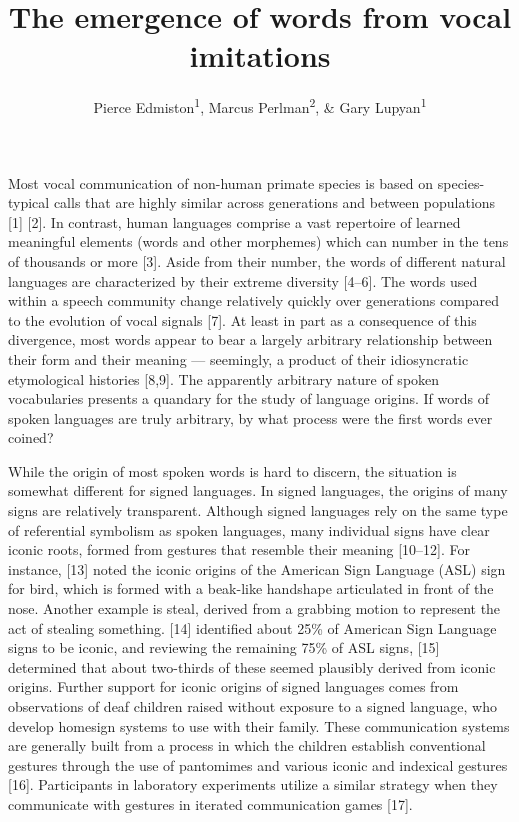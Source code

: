\documentclass[english,floatsintext,man]{apa6}
\title{The emergence of words from vocal imitations}
\author{Pierce Edmiston\textsuperscript{1}, Marcus Perlman\textsuperscript{2}, \& Gary Lupyan\textsuperscript{1}}
\affiliation{
    \vspace{0.5cm}
          \textsuperscript{1} University of Wisconsin-Madison\\
          \textsuperscript{2} University of Birmingham  }
\theoremstyle{definition}
\theoremstyle{definition}
\theoremstyle{definition}
\theoremstyle{remark}
\begin{document}
\maketitle

\setcounter{secnumdepth}{0}



Most vocal communication of non-human primate species is based on
species-typical calls that are highly similar across generations and
between populations {[}1{]} {[}2{]}. In contrast, human languages
comprise a vast repertoire of learned meaningful elements (words and
other morphemes) which can number in the tens of thousands or more
{[}3{]}. Aside from their number, the words of different natural
languages are characterized by their extreme diversity {[}4--6{]}. The
words used within a speech community change relatively quickly over
generations compared to the evolution of vocal signals {[}7{]}. At least
in part as a consequence of this divergence, most words appear to bear a
largely arbitrary relationship between their form and their meaning ---
seemingly, a product of their idiosyncratic etymological histories
{[}8,9{]}. The apparently arbitrary nature of spoken vocabularies
presents a quandary for the study of language origins. If words of
spoken languages are truly arbitrary, by what process were the first
words ever coined?

While the origin of most spoken words is hard to discern, the situation
is somewhat different for signed languages. In signed languages, the
origins of many signs are relatively transparent. Although signed
languages rely on the same type of referential symbolism as spoken
languages, many individual signs have clear iconic roots, formed from
gestures that resemble their meaning {[}10--12{]}. For instance,
{[}13{]} noted the iconic origins of the American Sign Language (ASL)
sign for bird, which is formed with a beak-like handshape articulated in
front of the nose. Another example is steal, derived from a grabbing
motion to represent the act of stealing something. {[}14{]} identified
about 25\% of American Sign Language signs to be iconic, and reviewing
the remaining 75\% of ASL signs, {[}15{]} determined that about
two-thirds of these seemed plausibly derived from iconic origins.
Further support for iconic origins of signed languages comes from
observations of deaf children raised without exposure to a signed
language, who develop homesign systems to use with their family. These
communication systems are generally built from a process in which the
children establish conventional gestures through the use of pantomimes
and various iconic and indexical gestures {[}16{]}. Participants in
laboratory experiments utilize a similar strategy when they communicate
with gestures in iterated communication games {[}17{]}.
\end{document}

